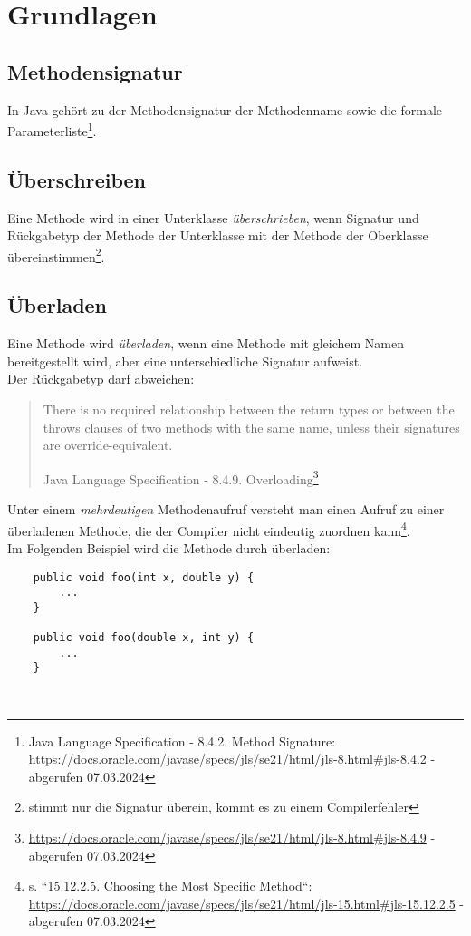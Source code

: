\section{Grundlagen}

\subsection{Methodensignatur}
In Java gehört zu der Methodensignatur der Methodenname sowie die formale Parameterliste\footnote {
    Java Language Specification - 8.4.2. Method Signature: \url{https://docs.oracle.com/javase/specs/jls/se21/html/jls-8.html#jls-8.4.2} - abgerufen 07.03.2024
}.

\subsection{Überschreiben}
Eine Methode wird in einer Unterklasse \textit{überschrieben}, wenn Signatur und Rückgabetyp der Methode der Unterklasse mit der
Methode der Oberklasse übereinstimmen\footnote{stimmt nur die Signatur überein, kommt es zu einem Compilerfehler}.\\


\subsection{Überladen}
Eine Methode wird \textit{überladen}, wenn eine Methode mit gleichem Namen bereitgestellt wird, aber eine unterschiedliche Signatur
aufweist.\\
Der Rückgabetyp darf abweichen:
\blockquote[Java Language Specification - 8.4.9. Overloading\footnote{\url{https://docs.oracle.com/javase/specs/jls/se21/html/jls-8.html#jls-8.4.9} - abgerufen 07.03.2024}]{
    There is no required relationship between the return types or between the throws clauses of two methods with the same name, unless their signatures are override-equivalent.
}

\noindent
Unter einem \textit{mehrdeutigen} Methodenaufruf versteht man einen Aufruf zu einer überladenen Methode, die der Compiler nicht eindeutig zuordnen kann\footnote{
s. ``15.12.2.5. Choosing the Most Specific Method``: \url{https://docs.oracle.com/javase/specs/jls/se21/html/jls-15.html#jls-15.12.2.5} - abgerufen 07.03.2024
}.\\
Im Folgenden Beispiel wird die Methode  durch  überladen:

\begin{verbatim}
    public void foo(int x, double y) {
        ...
    }

    public void foo(double x, int y) {
        ...
    }
\end{verbatim}\\

